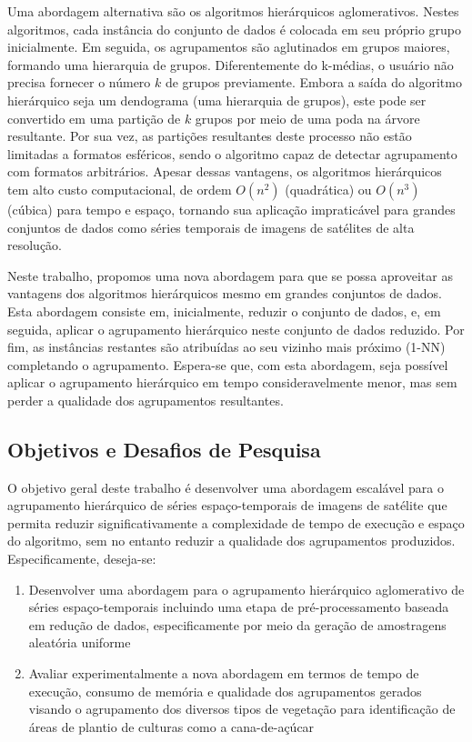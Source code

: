 Uma abordagem alternativa são os algoritmos hierárquicos aglomerativos. Nestes
algoritmos, cada instância do conjunto de dados é colocada em seu próprio grupo
inicialmente. Em seguida, os agrupamentos são aglutinados em grupos maiores, 
formando uma hierarquia de grupos. Diferentemente do k-médias, o usuário
não precisa fornecer o número $k$ de grupos previamente. Embora a saída do 
algoritmo hierárquico seja um dendograma (uma hierarquia de grupos), este pode
ser convertido em uma partição de $k$ grupos por meio de uma poda na árvore resultante.
Por sua vez, as partições resultantes deste processo não estão limitadas a formatos esféricos,
sendo o algoritmo capaz de detectar agrupamento
com formatos arbitrários. Apesar dessas vantagens, os algoritmos hierárquicos
tem alto custo computacional, de ordem $O(n^2)$ (quadrática) ou $O(n^3)$ 
(cúbica) para tempo e espaço, tornando sua aplicação impraticável para grandes conjuntos
de dados como séries temporais de imagens de satélites de alta resolução.

Neste trabalho, propomos uma nova abordagem para que se possa aproveitar
as vantagens dos algoritmos hierárquicos mesmo em grandes conjuntos de dados.
Esta abordagem consiste em, inicialmente, reduzir o conjunto de dados, e, em seguida, aplicar o agrupamento hierárquico neste conjunto de dados reduzido. Por fim, as instâncias restantes são atribuídas ao seu vizinho mais próximo (1-NN)
completando o agrupamento. Espera-se que, com esta abordagem, seja possível
aplicar o agrupamento hierárquico em tempo consideravelmente menor, mas sem
perder a qualidade dos agrupamentos resultantes.


\subsection{Objetivos e Desafios de Pesquisa}

O objetivo geral deste trabalho é desenvolver uma abordagem escalável para o agrupamento hierárquico de séries espaço-temporais de imagens de satélite que permita reduzir significativamente a complexidade de tempo de execução e espaço do algoritmo, sem no entanto reduzir a qualidade dos agrupamentos produzidos.
Especificamente, deseja-se:

\begin{enumerate}
    \item Desenvolver uma abordagem para o agrupamento hierárquico aglomerativo de séries espaço-temporais incluindo uma etapa de pré-processamento baseada em redução de dados, especificamente por meio da geração de amostragens aleatória uniforme 
    
    \item Avaliar experimentalmente a nova abordagem em termos de tempo de execução, consumo de memória e qualidade dos agrupamentos gerados visando o agrupamento dos diversos tipos de vegetação para identificação de áreas de plantio de culturas como a cana-de-açúcar
\end{enumerate}

